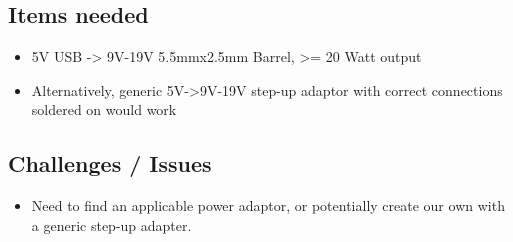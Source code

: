 \subsection{Items needed}
\begin{itemize}
    \item 5V USB -> 9V-19V 5.5mmx2.5mm Barrel, >= 20 Watt output
    \item Alternatively, generic 5V->9V-19V step-up adaptor with correct connections soldered on would work
\end{itemize}

\subsection{Challenges / Issues}
\begin{itemize}
    \item Need to find an applicable power adaptor, or potentially create our own with a generic step-up adapter.
\end{itemize}



